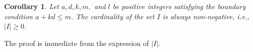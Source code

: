 \documentclass[12pt, english, a4paper]{article}
\theoremstyle{plain}
\newtheorem{corollary}[theorem]{Corollary}
\theoremstyle{definition}
\theoremstyle{remark}
\begin{document}
\begin{corollary}
Let $a, d, k, m,$ and $l$ be positive integers satisfying the boundary condition $a + kd \le m$. The cardinality of the set $I$ is always non-negative, i.e., $|I| \ge 0$.
\end{corollary}
The proof is immediate from the expression of $|I|$. 





\end{document}
